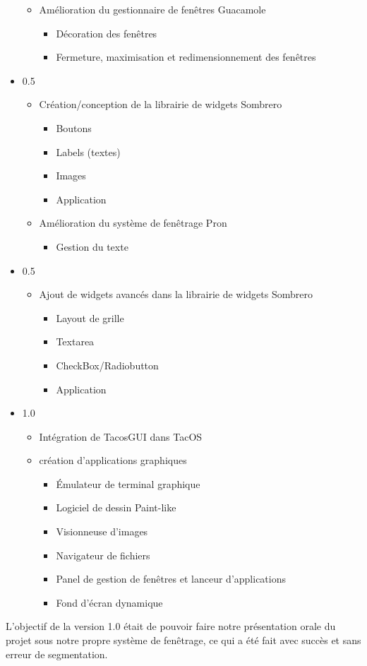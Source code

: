 \begin{itemize}
\begin{itemize}
      \item Amélioration du gestionnaire de fenêtres Guacamole
        \begin{itemize}
          \item Décoration des fenêtres
          \item Fermeture, maximisation et redimensionnement des fenêtres
      \end{itemize}
  \end{itemize}
  \item 0.5
    \begin{itemize}
      \item Création/conception de la librairie de widgets Sombrero
        \begin{itemize}
          \item Boutons
          \item Labels (textes)
          \item Images
          \item Application
      \end{itemize}
      \item Amélioration du système de fenêtrage Pron
        \begin{itemize}
          \item Gestion du texte
      \end{itemize}
  \end{itemize}
  \item 0.5
    \begin{itemize}
      \item Ajout de widgets avancés dans la librairie de widgets Sombrero
        \begin{itemize}
          \item Layout de grille
          \item Textarea
          \item CheckBox/Radiobutton
          \item Application
        \end{itemize}
    \end{itemize}
  \item 1.0
    \begin{itemize}
      \item Intégration de TacosGUI dans TacOS
      \item création d'applications graphiques
        \begin{itemize}
          \item Émulateur de terminal graphique
          \item Logiciel de dessin Paint-like
          \item Visionneuse d'images
          \item Navigateur de fichiers
          \item Panel de gestion de fenêtres et lanceur d'applications
          \item Fond d'écran dynamique
        \end{itemize}
    \end{itemize}
\end{itemize}

L'objectif de la version 1.0 était de pouvoir faire notre présentation orale du projet sous notre propre système de fenêtrage, ce qui a été fait avec succès et sans erreur de segmentation.
